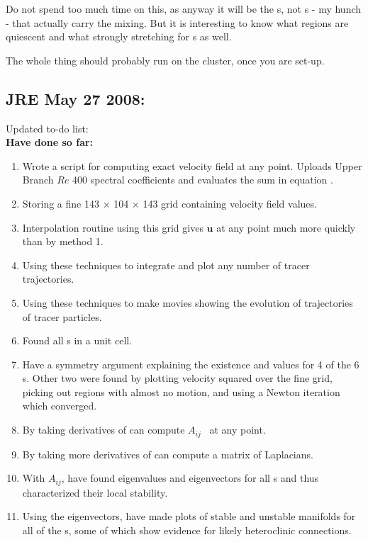 Do not spend too much time on this, as anyway it will be the
\po s, not
\stagp s - my hunch - that actually carry the mixing. But it is interesting
to know what regions are quiescent and what strongly stretching
for \stagp s as well.

The whole thing should probably run on the cluster, once you are
set-up.


\subsection{JRE May 27 2008:}

 Updated to-do list: \\

 \textbf{Have done so far:}
\begin{enumerate}
\item Wrote a script for computing exact velocity field at any point.
Uploads Upper Branch $Re$ 400 spectral coefficients and evaluates
the sum in equation .
\item Storing a fine 143 $\times$ 104 $\times$ 143 grid containing
velocity field values.
\item Interpolation routine using this grid gives $\mathbf{u}$ at
any point much more quickly than by method 1.
\item Using these techniques to integrate and plot any number of
tracer trajectories.
\item Using these techniques to make movies showing the evolution of
trajectories of tracer particles.
\item Found all \stagp s in a unit cell.
\item Have a symmetry argument explaining the existence and values
for 4 of the 6 \stagp s. Other two were found by plotting velocity
squared over the fine grid, picking out regions with almost no
motion, and using a Newton iteration which converged.
\item By taking derivatives of  can compute
$A_{ij}$ \velgradmat\ at any point.
\item By taking more derivatives of  can
compute a matrix of Laplacians.
\item With $A_{ij}$, have found eigenvalues and eigenvectors for all
\stagp s and thus characterized their local stability.
\item Using the eigenvectors, have made plots of stable and unstable
manifolds for all of the \stagp s, some of which show evidence for
likely heteroclinic connections.
\end{enumerate}

